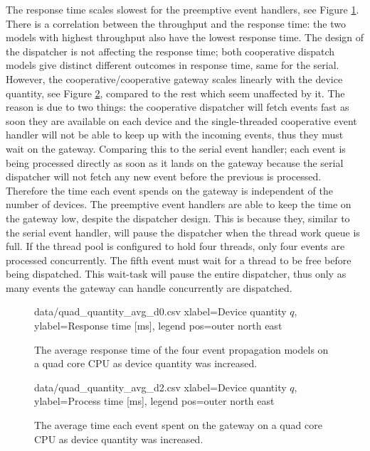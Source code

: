 The response time scales slowest for the preemptive event handlers, see Figure
\ref{fig:quad_quantity_avg_d0}. There is a correlation between the throughput
and the response time: the two models with highest throughput also have the
lowest response time. The design of the dispatcher is not affecting the
response time; both cooperative dispatch models give distinct different
outcomes in response time, same for the serial. However, the
cooperative/cooperative gateway scales linearly with the device quantity, see
Figure \ref{fig:quad_quantity_avg_d2}, compared to the rest which seem
unaffected by it. The reason is due to two things: the cooperative dispatcher
will fetch events fast as soon they are available on each device and the
single-threaded cooperative event handler will not be able to keep up with the
incoming events, thus they must wait on the gateway. Comparing this to the
serial event handler; each event is being processed directly as soon as it
lands on the gateway because the serial dispatcher will not fetch any new event
before the previous is processed. Therefore the time each event spends on the
gateway is independent of the number of devices. The preemptive event handlers
are able to keep the time on the gateway low, despite the dispatcher design.
This is because they, similar to the serial event handler, will pause the
dispatcher when the thread work queue is full. If the thread pool is configured
to hold four threads, only four events are processed concurrently. The fifth
event must wait for a thread to be free before being dispatched. This wait-task
will pause the entire dispatcher, thus only as many events the gateway can
handle concurrently are dispatched.

\begin{figure}[h!]
    \centering
    \performanceplot
    {data/quad_quantity_avg_d0.csv}
    {
        xlabel=Device quantity $q$,
        ylabel={Response time [ms]},
        legend pos=outer north east
    }

    \caption[Response time result when device quantity was increased.]{The
    average response time of the four event propagation models on a quad core
    CPU as device quantity was increased.}

    \label{fig:quad_quantity_avg_d0}
\end{figure}

\begin{figure}[h!]
    \centering
    \performanceplot
    {data/quad_quantity_avg_d2.csv}
    {
        xlabel=Device quantity $q$,
        ylabel={Process time [ms]},
        legend pos=outer north east
    }

    \caption[Time spent on gateway when device quantity was increased.]{The
    average time each event spent on the gateway on a quad core CPU as device
    quantity was increased.}

    \label{fig:quad_quantity_avg_d2}
\end{figure}

